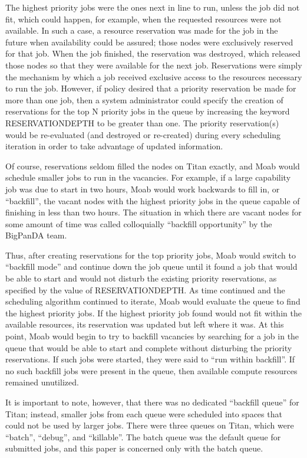 The highest priority jobs were the ones next in line to run, unless the job did
not fit, which could happen, for example, when the requested resources were not
available. In such a case, a resource reservation was made for the job in the
future when availability could be assured; those nodes were exclusively
reserved for that job. When the job finished, the reservation was destroyed,
which released those nodes so that they were available for the next job.
Reservations were simply the mechanism by which a job received exclusive access
to the resources necessary to run the job. However, if policy desired that a
priority reservation be made for more than one job, then a system administrator
could specify the creation of reservations for the top N priority jobs in the
queue by increasing the keyword RESERVATIONDEPTH to be greater than one. The
priority reservation(s) would be re-evaluated (and destroyed or re-created)
during every scheduling iteration in order to take advantage of updated
information. 

Of course, reservations seldom filled the nodes on Titan exactly, and Moab
would schedule smaller jobs to run in the vacancies. For example, if a large
capability job was due to start in two hours, Moab would work backwards to fill
in, or ``backfill'', the vacant nodes with the highest priority jobs in the
queue capable of finishing in less than two hours. The situation in which there
are vacant nodes for some amount of time was called colloquially ``backfill
opportunity'' by the BigPanDA team.

Thus, after creating reservations for the top priority jobs, Moab would switch
to ``backfill mode'' and continue down the job queue until it found a job that
would be able to start and would not disturb the existing priority
reservations, as specified by the value of RESERVATIONDEPTH. As time continued
and the scheduling algorithm continued to iterate, Moab would evaluate the
queue to find the highest priority jobs. If the highest priority job found
would not fit within the available resources, its reservation was updated but
left where it was. At this point, Moab would begin to try to backfill vacancies
by searching for a job in the queue that would be able to start and complete
without disturbing the priority reservations. If such jobs were started, they
were said to ``run within backfill''. If no such backfill jobs were present in
the queue, then available compute resources remained unutilized. 

It is important to note, however, that there was no dedicated ``backfill
queue'' for Titan; instead, smaller jobs from each queue were scheduled into
spaces that could not be used by larger jobs. There were three queues on Titan,
which were ``batch'', ``debug'', and ``killable''. The batch queue was the
default queue for submitted jobs, and this paper is concerned only with the
batch queue.

